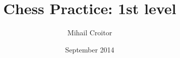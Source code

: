 \documentclass[a5paper]{book}
\title{Chess Practice: 1st level}
\author{Mihail Croitor}
\date{September 2014}
\begin{document}
\maketitle


\pagebreak


\smallbreak

\smallbreak

\smallbreak

\smallbreak

\smallbreak

\smallbreak

\smallbreak

\smallbreak


\pagebreak


\smallbreak

\smallbreak

\smallbreak

\smallbreak

\smallbreak


\pagebreak


\smallbreak

\smallbreak

\smallbreak

\smallbreak

\smallbreak

\smallbreak


\pagebreak


\smallbreak

\smallbreak


\pagebreak

\renewcommand{\labelenumi}{\bf{D.\arabic{enumi}}}
\begin{multicols}{3}






\end{multicols}
\smallbreak
\end{document}
